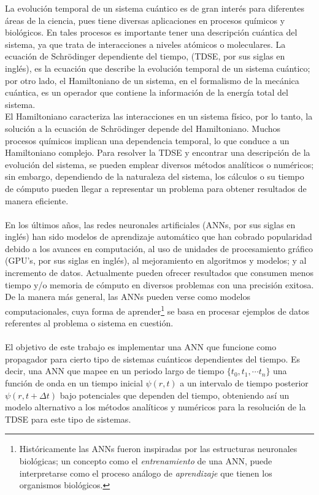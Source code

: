 La evolución temporal de un sistema cuántico es de gran interés para diferentes áreas de la ciencia, pues tiene diversas aplicaciones en procesos químicos y biológicos. En tales procesos es importante tener una descripción cuántica del sistema, ya que trata de interacciones a niveles atómicos o moleculares. La ecuación de Schrödinger dependiente del tiempo, (\acs{TDSE}, por sus siglas en inglés), es la ecuación que describe la evolución temporal de un sistema cuántico; por otro lado, el Hamiltoniano de un sistema, en el formalismo de la mecánica cuántica, es un operador que contiene la información de la energía total del sistema.
\\
El Hamiltoniano caracteriza las interacciones en un sistema físico, por lo tanto, la solución a la ecuación de Schrödinger depende del Hamiltoniano. Muchos procesos químicos implican una dependencia temporal, lo que conduce a un Hamiltoniano complejo. Para resolver la \acs{TDSE} y encontrar una descripción de la evolución del sistema, se pueden emplear diversos métodos analíticos o numéricos; sin embargo, dependiendo de la naturaleza del sistema, los cálculos o su tiempo de cómputo pueden llegar a representar un problema para obtener resultados de manera eficiente.
\\
\\
En los últimos años, las redes neuronales artificiales (\acs{ANN}s, por sus siglas en inglés) han sido modelos de aprendizaje automático que han cobrado popularidad debido a los avances en computación, al uso de unidades de procesamiento gráfico (GPU's, por sus siglas en inglés), al mejoramiento en algoritmos y modelos; y al incremento de datos. Actualmente pueden ofrecer resultados que consumen menos tiempo y/o memoria de cómputo en diversos problemas con una precisión exitosa. De la manera más general, las \acs{ANN}s pueden verse como modelos computacionales, cuya forma de aprender\footnote{Históricamente las \acs{ANN}s fueron inspiradas por las estructuras neuronales biológicas; un concepto como el \emph{entrenamiento} de una \acs{ANN}, puede interpretarse como el proceso análogo de \emph{aprendizaje} que tienen los organismos biológicos.} se basa en procesar ejemplos de datos referentes al problema o sistema en cuestión.
\\
\\
El objetivo de este trabajo es implementar una \acs{ANN} que funcione como propagador para cierto tipo de sistemas cuánticos dependientes del tiempo. Es decir, una \acs{ANN} que mapee en un periodo largo de tiempo $\{t_0,t_1,\cdots t_n\}$ una función de onda en un tiempo inicial $\psi(r,t)$ a un intervalo de tiempo posterior $\psi(r,t+\Delta t)$ bajo potenciales que dependen del tiempo, obteniendo así un modelo alternativo a los métodos analíticos y numéricos para la resolución de la \acs{TDSE} para este tipo de sistemas.

